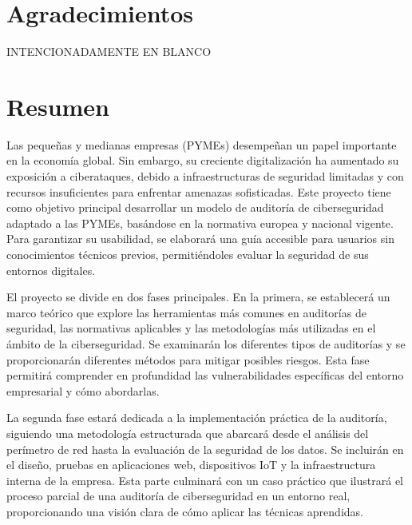 \documentclass[a4paper, 10pt]{article}
\begin{document}
\section*{Agradecimientos}
\thispagestyle{empty}
INTENCIONADAMENTE EN BLANCO

\clearpage


\section*{Resumen}
\thispagestyle{empty}
Las pequeñas y medianas empresas (PYMEs) desempeñan un papel importante en la economía global. Sin embargo, su creciente
digitalización ha aumentado su exposición a ciberataques, debido a infraestructuras de seguridad limitadas y con recursos insuficientes para enfrentar amenazas sofisticadas. 
Este proyecto tiene como objetivo principal desarrollar un modelo de auditoría de ciberseguridad adaptado a las PYMEs, basándose en la normativa europea y nacional vigente. Para garantizar su usabilidad, se elaborará una guía accesible para usuarios sin conocimientos técnicos previos, permitiéndoles evaluar la seguridad de sus entornos digitales.
\par\vspace{0.5cm}

El proyecto se divide en dos fases principales. En la primera, se establecerá un marco teórico que explore las herramientas más comunes en auditorías de seguridad, las normativas aplicables y las metodologías más utilizadas en el ámbito de la ciberseguridad. Se examinarán los diferentes tipos de auditorías y se proporcionarán diferentes métodos para mitigar posibles riesgos. Esta fase permitirá comprender en profundidad las vulnerabilidades específicas del entorno empresarial y cómo abordarlas.
\par\vspace{0.5cm}

La segunda fase estará dedicada a la implementación práctica de la auditoría, siguiendo una 
metodología estructurada que abarcará desde el análisis del perímetro de red hasta la evaluación de la seguridad de los datos. 
Se incluirán en el diseño, pruebas en aplicaciones web, dispositivos IoT y la infraestructura interna de la empresa. 
Esta parte culminará con un caso práctico que ilustrará el proceso parcial de una auditoría de ciberseguridad en un entorno real, proporcionando una visión clara de cómo aplicar las técnicas aprendidas.
\par\vspace{0.5cm}
\end{document}
